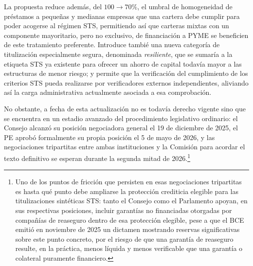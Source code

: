\documentclass[10pt,a4paper]{article}
\begin{document}
{La propuesta reduce además, del $100\to70\%$, el umbral de homogeneidad de préstamos a pequeñas y medianas empresas que una cartera debe cumplir para poder acogerse al régimen STS, permitiendo así que carteras mixtas con un componente mayoritario, pero no exclusivo, de financiación a PYME se beneficien de este tratamiento preferente. Introduce tambié una nueva categoría de titulización especialmente segura, denominada \textit{resiliente}, que se sumaría a la etiqueta STS ya existente para ofrecer un ahorro de capital todavía mayor a las estructuras de menor riesgo; y permite que la verificación del cumplimiento de los criterios STS pueda realizarse por verificadores externos independientes, aliviando así la carga administrativa actualmente asociada a esa comprobación.

No obstante, a fecha de esta actualización no es todavía derecho vigente sino que se encuentra en un estadio avanzado del procedimiento legislativo ordinario: el Consejo alcanzó su posición negociadora general el 19 de diciembre de 2025, el PE aprobó formalmente su propia posición el 5 de mayo de 2026, y las negociaciones tripartitas entre ambas instituciones y la Comisión para acordar el texto definitivo se esperan durante la segunda mitad de 2026.\footnote{%
    Uno de los puntos de fricción que persisten en esas negociaciones tripartitas es hasta qué punto debe ampliarse la protección crediticia elegible para las titulizaciones sintéticas STS: tanto el Consejo como el Parlamento apoyan, en sus respectivas posiciones, incluir garantías no financiadas otorgadas por compañías de reaseguro dentro de esa protección elegible, pese a que el BCE emitió en noviembre de 2025 un dictamen mostrando reservas significativas sobre este punto concreto, por el riesgo de que una garantía de reaseguro resulte, en la práctica, menos líquida y menos verificable que una garantía o colateral puramente financiero.
} 

}
\end{document}
